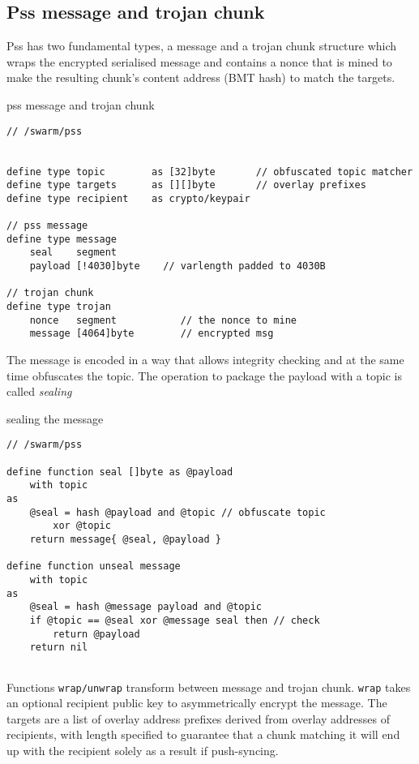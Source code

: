 \subsection{Pss message and trojan chunk}

Pss has two fundamental types, a message and a trojan chunk structure which wraps the encrypted serialised message and contains a nonce that is mined to make the resulting chunk's content address (BMT hash) to match the targets.


\begin{definition}{pss message and trojan chunk}\label{def:pss-message}
\begin{lstlisting}[language=buzz1]
// /swarm/pss


define type topic        as [32]byte       // obfuscated topic matcher
define type targets      as [][]byte       // overlay prefixes 
define type recipient    as crypto/keypair

// pss message
define type message 
    seal    segment            
    payload [!4030]byte    // varlength padded to 4030B
    
// trojan chunk
define type trojan 
    nonce   segment           // the nonce to mine 
    message [4064]byte        // encrypted msg 
\end{lstlisting}
\end{definition}


The message is encoded in a way that allows integrity checking and at the same time obfuscates the topic. The operation to package the payload with a topic is called \emph{sealing}


\begin{definition}{sealing the message}\label{def:pss-sealing}
\begin{lstlisting}[language=buzz1]
// /swarm/pss

define function seal []byte as @payload
    with topic
as
    @seal = hash @payload and @topic // obfuscate topic
        xor @topic          
    return message{ @seal, @payload }

define function unseal message
    with topic 
as
    @seal = hash @message payload and @topic 
    if @topic == @seal xor @message seal then // check 
        return @payload 
    return nil
    
\end{lstlisting}
\end{definition}

Functions \lstinline{wrap/unwrap} transform between message and trojan chunk. \lstinline{wrap} takes an optional recipient public key to asymmetrically encrypt the message.
The targets are a list of overlay address prefixes derived from overlay addresses of recipients, with length specified to guarantee that a chunk matching it will end up with the recipient solely as a result if  push-syncing.   

